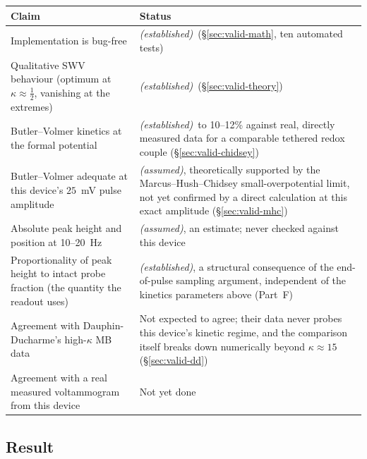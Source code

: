 \documentclass[10pt,a4paper]{article}
\numberwithin{equation}{section}
\newcommand{\FLAG}{\textit{(assumed)}}
\newcommand{\CONF}{\textit{(established)}}
\begin{document}
\begin{center}
\small\renewcommand{\arraystretch}{1.25}
\begin{tabular}{@{}p{5.6cm}p{8cm}@{}}
\toprule
Claim & Status \\
\midrule
Implementation is bug-free & \CONF\ (\S\ref{sec:valid-math}, ten automated tests) \\
Qualitative SWV behaviour (optimum at $\kappa\approx\tfrac12$, vanishing at the extremes) & \CONF\ (\S\ref{sec:valid-theory}) \\
Butler--Volmer kinetics at the formal potential & \CONF\ to 10--12\% against real, directly measured
  data for a comparable tethered redox couple (\S\ref{sec:valid-chidsey}) \\
Butler--Volmer adequate at this device's $25$~mV pulse amplitude & \FLAG, theoretically supported by the
  Marcus--Hush--Chidsey small-overpotential limit, not yet confirmed by a direct calculation at this exact
  amplitude (\S\ref{sec:valid-mhc}) \\
Absolute peak height and position at 10--20~Hz & \FLAG, an estimate; never checked against this device \\
Proportionality of peak height to intact probe fraction (the quantity the readout uses) & \CONF, a
  structural consequence of the end-of-pulse sampling argument, independent of the kinetics parameters
  above (Part~F) \\
Agreement with Dauphin-Ducharme's high-$\kappa$ MB data & Not expected to agree; their data never probes
  this device's kinetic regime, and the comparison itself breaks down numerically beyond $\kappa\approx15$
  (\S\ref{sec:valid-dd}) \\
Agreement with a real measured voltammogram from this device & Not yet done \\
\bottomrule
\end{tabular}
\end{center}

\subsection{Result}
\end{document}
